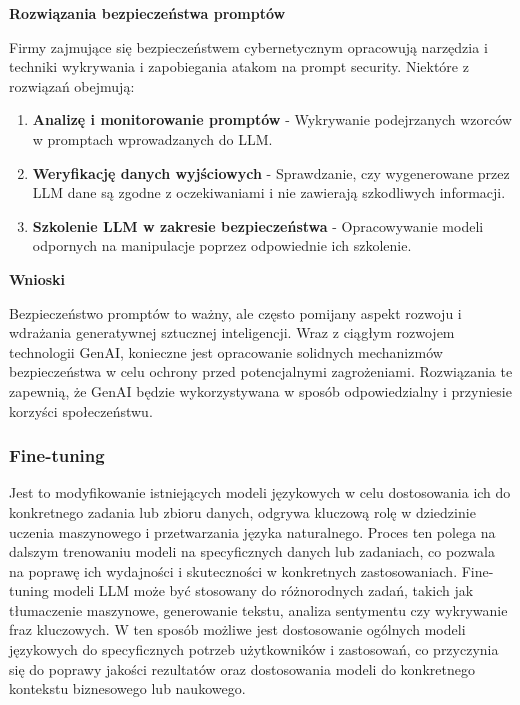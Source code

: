 {\bf Rozwiązania bezpieczeństwa promptów}

\noindent Firmy zajmujące się bezpieczeństwem cybernetycznym opracowują narzędzia i techniki wykrywania i zapobiegania atakom na prompt security. Niektóre z rozwiązań obejmują:

\begin{enumerate}
    \item {\bf Analizę i monitorowanie promptów} - Wykrywanie podejrzanych wzorców w promptach wprowadzanych do LLM.
    \item {\bf Weryfikację danych wyjściowych} - Sprawdzanie, czy wygenerowane przez LLM dane są zgodne z oczekiwaniami i nie zawierają szkodliwych informacji.
    \item {\bf Szkolenie LLM w zakresie bezpieczeństwa} - Opracowywanie modeli odpornych na manipulacje poprzez odpowiednie ich szkolenie.
\end{enumerate}

{\bf Wnioski}

\noindent Bezpieczeństwo promptów to ważny, ale często pomijany aspekt rozwoju i wdrażania generatywnej sztucznej inteligencji. Wraz z ciągłym rozwojem technologii GenAI, konieczne jest opracowanie solidnych mechanizmów bezpieczeństwa w celu ochrony przed potencjalnymi zagrożeniami. Rozwiązania te zapewnią, że GenAI będzie wykorzystywana w sposób odpowiedzialny i przyniesie korzyści społeczeństwu.


\subsubsection{Fine-tuning}
Jest to modyfikowanie istniejących modeli językowych w celu dostosowania ich do konkretnego zadania lub zbioru danych, odgrywa kluczową rolę w dziedzinie uczenia maszynowego i przetwarzania języka naturalnego. Proces ten polega na dalszym trenowaniu modeli na specyficznych danych lub zadaniach, co pozwala na poprawę ich wydajności i skuteczności w konkretnych zastosowaniach. Fine-tuning modeli LLM może być stosowany do różnorodnych zadań, takich jak tłumaczenie maszynowe, generowanie tekstu, analiza sentymentu czy wykrywanie fraz kluczowych. W ten sposób możliwe jest dostosowanie ogólnych modeli językowych do specyficznych potrzeb użytkowników i zastosowań, co przyczynia się do poprawy jakości rezultatów oraz dostosowania modeli do konkretnego kontekstu biznesowego lub naukowego.

